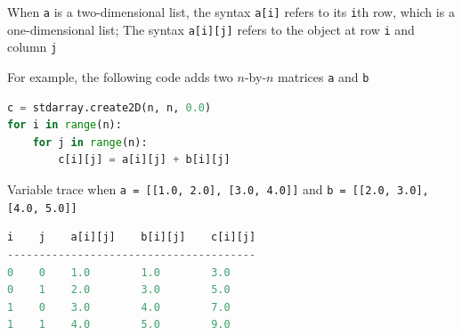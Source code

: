 \documentclass[8pt,a4paper,compress]{beamer}
\begin{document}
\begin{frame}[fragile]
\pause

When \lstinline{a} is a two-dimensional list, the syntax \lstinline{a[i]} refers to its \lstinline{i}th row, which is a one-dimensional list; The syntax \lstinline{a[i][j]} refers to the object at row \lstinline{i} and column \lstinline{j}

\pause\bigskip

For example, the following code adds two $n$-by-$n$ matrices \lstinline{a} and \lstinline{b}

\smallskip

\begin{lstlisting}[language=Python,style=focusin]
c = stdarray.create2D(n, n, 0.0)
for i in range(n):
    for j in range(n):
        c[i][j] = a[i][j] + b[i][j]
\end{lstlisting}

\pause\bigskip

Variable trace when \lstinline{a = [[1.0, 2.0], [3.0, 4.0]]} and \lstinline{b = [[2.0, 3.0], [4.0, 5.0]]}

\smallskip

\begin{lstlisting}[language=Python]
i    j    a[i][j]    b[i][j]    c[i][j]
---------------------------------------
0    0    1.0        1.0        3.0
0    1    2.0        3.0        5.0
1    0    3.0        4.0        7.0
1    1    4.0        5.0        9.0
\end{lstlisting}
\end{frame}
\end{document}
